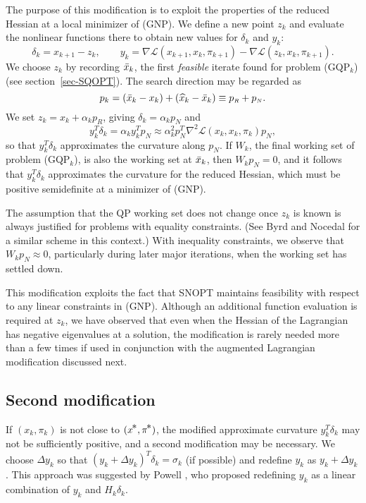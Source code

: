 \documentclass[draft,leqno,onefignum,onetabnum]{siamltex}
\def\varDelta{{\mathit\Delta}}
\def\Deltait{\varDelta}
\def\grad{\nabla}
\def\Hess{\nabla^2}
\def\kp#1{_{k+#1}}
\def\N{_{\scriptscriptstyle N}}
\def\R{_{\scriptscriptstyle R}}
\def\nthinsp{\mskip -2   mu}
\def\Lscr{{\mathcal L}}
\def\pistar{\pi\superstar}
\def\superstar{^{\raise 0.5pt\hbox{$\nthinsp *$}}}
\def\T{^T\!}
\def\xbar{\skew{2.8}\bar x}
\def\xhat{\skew{2.8}\widehat x}
\def\xstar{x\superstar}
\def\Deltay{\Deltait y}
\def\GQPk{GQP$_k$}
\def\L {\Lscr}                    %
\def\SNOPT {{\small SNOPT}}
\begin{document}
The purpose of this modification is to exploit the properties of the
reduced Hessian at a local minimizer of (GNP)\@.
We define a new point $z_k$ and evaluate the nonlinear
functions there to obtain new values for $\delta_k$ and $y_k$:
$$
   \delta_k = x\kp1 - z_k, \qquad
   y_k      = \grad\L(x\kp1,x_k,\pi\kp1) - \grad\L(z_k,x_k,\pi\kp1).
$$
We choose $z_k$ by recording $\xbar_k$, the first \emph{feasible}
iterate found for problem (\GQPk) (see section~\ref{sec-SQOPT}).
The search direction may be regarded as
$$
   p_k = (\xbar_k - x_k)  +  (\xhat_k - \xbar_k) \equiv p\R + p\N.
$$
We set $z_k = x_k + \alpha_k p\R$, giving $\delta_k = \alpha_k p\N$ and
$$
   y_k\T \delta_k  =      \alpha_k y_k\T p\N
                  \approx \alpha_k^2 p\N^T \Hess\L(x_k,x_k,\pi_k) p\N,
$$
so that $y_k\T \delta_k$ approximates the curvature along $p\N$.
If $W_k$, the final working set of problem (\GQPk), is also the working
set at $\xbar_k$, then $W_k p\N = 0$, and it follows that
$y_k\T\delta_k$ approximates the curvature for the reduced Hessian,
which must be positive semidefinite at a minimizer of (GNP)\@.

 The assumption that the QP working set does not change once $z_k$ is
known is always justified for problems with equality constraints.  (See
Byrd and Nocedal \cite{ByrN91} for a similar scheme in this context.)
With inequality constraints, we observe that $W_k p\N \approx 0$,
particularly during later major iterations, when the working set has
settled down.

 This modification exploits the fact that \SNOPT{} maintains
feasibility with respect to any linear constraints in (GNP)\@.
Although an additional function evaluation is required at $z_k$,
we have observed that even when the Hessian of the
Lagrangian has negative eigenvalues at a solution,
the modification is rarely needed more than a few times if used
in conjunction with the augmented Lagrangian modification discussed next.


\subsection*{Second modification}

 If $(x_k,\pi_k)$ is not close to $(\xstar,\pistar)$, the modified
approximate curvature $y_k\T\delta_k$ may not be sufficiently
positive, and a second modification may be necessary.  We
choose $\Deltay_k$ so that $(y_k+\Deltay_k)\T\delta_k = \sigma_k$
(if possible) and redefine $y_k$ as $y_k + \Deltay_k$. This
approach was suggested by Powell \cite{Pow78b}, who proposed
redefining $y_k$ as a linear combination of $y_k$ and $H_k\delta_k$.
\end{document}
